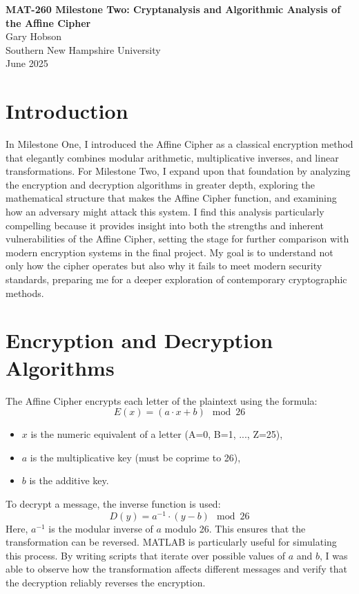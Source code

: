 \documentclass[12pt]{article}
\begin{document}
\begin{center}
    \textbf{\Large MAT-260 Milestone Two: Cryptanalysis and Algorithmic Analysis of the Affine Cipher} \\
    \vspace{0.5cm}
    Gary Hobson \\
    Southern New Hampshire University \\
    June 2025
\end{center}

\thispagestyle{empty}

\clearpage

\section*{Introduction}
In Milestone One, I introduced the Affine Cipher as a classical encryption method that elegantly combines modular arithmetic, multiplicative inverses, and linear transformations. For Milestone Two, I expand upon that foundation by analyzing the encryption and decryption algorithms in greater depth, exploring the mathematical structure that makes the Affine Cipher function, and examining how an adversary might attack this system. I find this analysis particularly compelling because it provides insight into both the strengths and inherent vulnerabilities of the Affine Cipher, setting the stage for further comparison with modern encryption systems in the final project. My goal is to understand not only how the cipher operates but also why it fails to meet modern security standards, preparing me for a deeper exploration of contemporary cryptographic methods.

\section*{Encryption and Decryption Algorithms}
The Affine Cipher encrypts each letter of the plaintext using the formula:
\[
E(x) = (a \cdot x + b) \mod 26
\]
\begin{itemize}
    \item \( x \) is the numeric equivalent of a letter (A=0, B=1, ..., Z=25),
    \item \( a \) is the multiplicative key (must be coprime to 26),
    \item \( b \) is the additive key.
\end{itemize}
To decrypt a message, the inverse function is used:
\[
D(y) = a^{-1} \cdot (y - b) \mod 26
\]
Here, \( a^{-1} \) is the modular inverse of \( a \) modulo 26. This ensures that the transformation can be reversed. MATLAB is particularly useful for simulating this process. By writing scripts that iterate over possible values of \( a \) and \( b \), I was able to observe how the transformation affects different messages and verify that the decryption reliably reverses the encryption.
\end{document}
